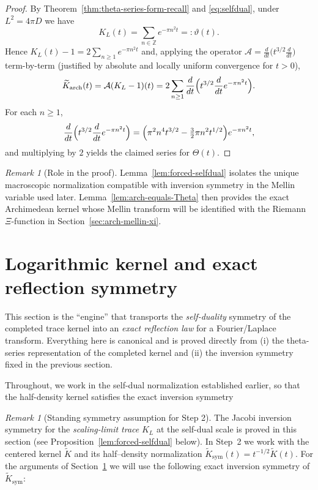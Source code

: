 \documentclass[12pt]{amsart}
\theoremstyle{definition}
\theoremstyle{remark}
\newtheorem{remark}[theorem]{Remark}
\newcommand{\Z}{\mathbb{Z}}
\begin{document}
\begin{proof}
By Theorem~\ref{thm:theta-series-form-recall} and \eqref{eq:selfdual}, under $L^2=4\pi D$ we have
\[
K_L(t)=\sum_{n\in\Z}e^{-\pi n^2 t}=:\vartheta(t).
\]
Hence $K_L(t)-1=2\sum_{n\ge 1}e^{-\pi n^2 t}$ and, applying the operator
$\mathcal{A}=\frac{d}{dt}\bigl(t^{3/2}\frac{d}{dt}\bigr)$ term-by-term (justified by absolute and
locally uniform convergence for $t>0$),
\[
\widetilde K_{\mathrm{arch}}(t)=\mathcal{A}(K_L-1)(t)
=2\sum_{n\ge 1}\frac{d}{dt}\Bigl(t^{3/2}\frac{d}{dt}e^{-\pi n^2 t}\Bigr).
\]
For each $n\ge 1$,
\[
\frac{d}{dt}\Bigl(t^{3/2}\frac{d}{dt}e^{-\pi n^2 t}\Bigr)
=\Bigl(\pi^2 n^4 t^{3/2}-\tfrac{3}{2}\pi n^2 t^{1/2}\Bigr)e^{-\pi n^2 t},
\]
and multiplying by $2$ yields the claimed series for $\Theta(t)$.
\end{proof}

\begin{remark}[Role in the proof]
\label{rem:Theta-role}
Lemma~\ref{lem:forced-selfdual} isolates the unique macroscopic normalization compatible with
inversion symmetry in the Mellin variable used later. Lemma~\ref{lem:arch-equals-Theta} then
provides the exact Archimedean kernel whose Mellin transform will be identified with the
Riemann $\Xi$-function in Section~\ref{sec:arch-mellin-xi}.
\end{remark}




\section{Logarithmic kernel and exact reflection symmetry}
\label{sec:log-reflection}

This section is the ``engine'' that transports the \emph{self-duality} symmetry of the
completed trace kernel into an \emph{exact reflection law} for a Fourier/Laplace transform.
Everything here is canonical and is proved directly from (i) the theta-series representation
of the completed kernel and (ii) the inversion symmetry fixed in the previous section.

Throughout, we work in the self-dual normalization established earlier, so that the
half-density kernel satisfies the exact inversion symmetry

\begin{remark}[Standing symmetry assumption for Step 2]\label{rem:standing-symmetry}
The Jacobi inversion symmetry for the \emph{scaling-limit trace} $K_L$ at the self-dual scale
is proved in this section (see Proposition~\ref{lem:forced-selfdual} below).
In Step~2 we work with the centered kernel $\widetilde K$ and its half--density normalization
$\widetilde K_{\mathrm{sym}}(t)=t^{-1/2}\widetilde K(t)$. For the arguments of Section~\ref{sec:log-reflection}
we will use the following exact inversion symmetry of $\widetilde K_{\mathrm{sym}}$:
\end{remark}
\end{document}
